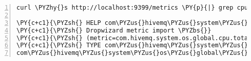 \begin{Verbatim}[commandchars=\\\{\},numbers=left,firstnumber=1,stepnumber=1,frame=single]
curl \PYZhy{}s http://localhost:9399/metrics \PY{p}{|} grep cpu\PYZus{}total\PYZus{}total

\PY{c+c1}{\PYZsh{} HELP com\PYZus{}hivemq\PYZus{}system\PYZus{}os\PYZus{}global\PYZus{}cpu\PYZus{}total\PYZus{}total Generated from \PYZbs{}}
\PY{c+c1}{\PYZsh{} Dropwizard metric import \PYZbs{}}
\PY{c+c1}{\PYZsh{} (metric=com.hivemq.system.os.global.cpu.total.total, type=eO.h)}
\PY{c+c1}{\PYZsh{} TYPE com\PYZus{}hivemq\PYZus{}system\PYZus{}os\PYZus{}global\PYZus{}cpu\PYZus{}total\PYZus{}total gauge}
com\PYZus{}hivemq\PYZus{}system\PYZus{}os\PYZus{}global\PYZus{}cpu\PYZus{}total\PYZus{}total \PY{l+m}{5}.0
\end{Verbatim}
